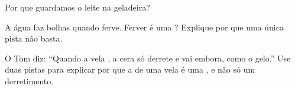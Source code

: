 \begin{exercise}[$\star$]\label{exo:g5:irreversible-changes:9}
Por que guardamos o leite na geladeira?
\end{exercise}

\begin{exercise}[$\star\star$]\label{exo:g5:irreversible-changes:10}
A água faz bolhas quando ferve. Ferver é uma ?
Explique por que uma única pista não basta.
\end{exercise}

\begin{exercise}[$\star\star$]\label{exo:g5:irreversible-changes:11}
O Tom diz: ``Quando a vela , a cera só derrete e vai embora, como
o gelo.'' Use duas pistas para explicar por que a  de uma vela é
uma , e não só um derretimento.
\end{exercise}
